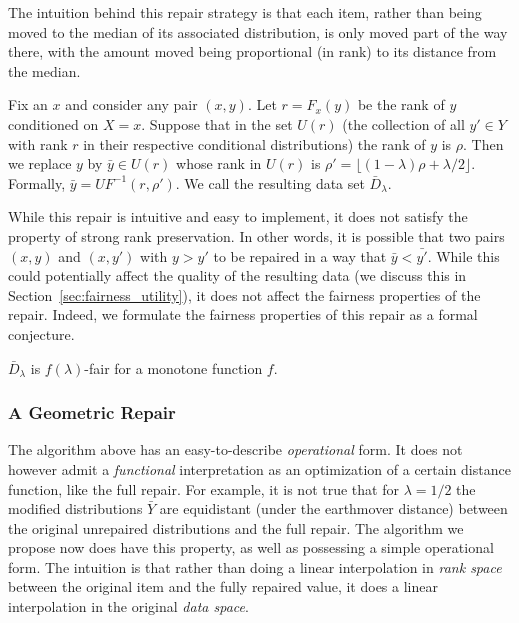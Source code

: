 The intuition behind this repair strategy is that each item, rather than being moved to the median of its associated distribution, is only moved part of the way there, with the amount moved being proportional (in rank) to its distance from the median. 
\begin{defn}
  Fix an $x$ and consider any pair $(x,y)$. Let $r = F_x(y)$ be the rank of $y$ conditioned on $X = x$. Suppose that in the set $U(r)$ (the collection of all $y' \in Y$ with rank $r$ in their respective conditional distributions) the rank of $y$ is $\rho$. Then we  replace $y$ by $\bar{y} \in U(r)$ whose rank in $U(r)$ is $\rho' = \lfloor (1-\lambda)\rho + \lambda/2\rfloor$. Formally, $\bar{y} = UF^{-1}(r,\rho')$. We call the resulting data set $\bar{D}_\lambda$.  
\end{defn}
While this repair is intuitive and easy to implement, it does not satisfy the property of strong rank preservation. In other words, it is possible that two pairs $(x, y)$ and $(x, y')$ with $y > y'$ to be repaired in a way that $\bar{y} < \bar{y'}$. While this could potentially affect the quality of the resulting data (we discuss this in Section~\ref{sec:fairness_utility}), it does not affect the fairness properties of the repair. Indeed, we formulate the fairness properties of this repair as a formal conjecture. 

\begin{conjecture}
\label{partial_eps_fair}
$\bar{D}_\lambda$ is $f(\lambda)$-fair for a monotone function $f$. 
\end{conjecture}



\subsubsection{A Geometric Repair}
\label{sec:geometric-repair}


The algorithm above has an easy-to-describe \emph{operational} form. It does not however admit a \emph{functional} interpretation as an optimization of a certain distance function, like the full repair. For example, it is not true that for $\lambda = 1/2$ the modified distributions $\bar{Y}$ are equidistant (under the earthmover distance) between the original unrepaired distributions and the full repair.  The algorithm we propose now does have this property, as well as possessing a simple operational form. The intuition is that rather than doing a linear interpolation in \emph{rank space} between the original item and the fully repaired value, it does a linear interpolation in the original \emph{data space}. 

